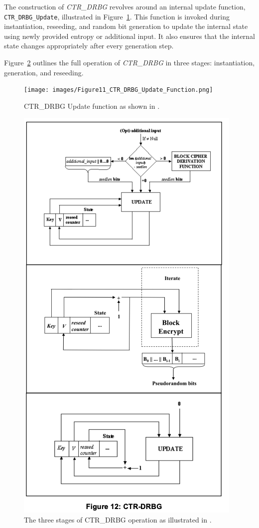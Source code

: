 The construction of \textit{CTR\_DRBG} revolves around an internal update function, \texttt{CTR\_DRBG\_Update}, illustrated in Figure~\ref{fig:ctr_drbg_update}. This function is invoked during instantiation, reseeding, and random bit generation to update the internal state using newly provided entropy or additional input. It also ensures that the internal state changes appropriately after every generation step.

Figure~\ref{fig:ctr_drbg_stages} outlines the full operation of \textit{CTR\_DRBG} in three stages: instantiation, generation, and reseeding.

\begin{figure}[htbp]
    \centering
    \texttt{[image: images/Figure11\_CTR\_DRBG\_Update\_Function.png]}
    \caption{CTR\_DRBG Update function as shown in \cite{nist-sp800-90a}.}
    \label{fig:ctr_drbg_update}
\end{figure}

\begin{figure}[htbp]
    \centering
    \includegraphics[width=0.9\linewidth]{images/Figure12_CTR_DRBG.png}
    \caption{The three stages of CTR\_DRBG operation as illustrated in \cite{nist-sp800-90a}.}
    \label{fig:ctr_drbg_stages}
\end{figure}


